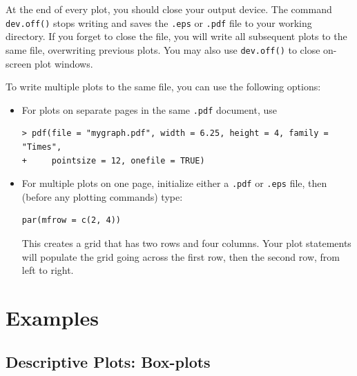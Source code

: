 \documentclass{article}
\begin{document}
At the end of every plot, you should close your output device.  The
command \texttt{dev.off()} stops writing and saves the \texttt{.eps}
or {\tt .pdf} file to your working directory.  If you forget to close
the file, you will write all subsequent plots to the same file,
overwriting previous plots.  You may also use \texttt{dev.off()} to close
on-screen plot windows.

To write multiple plots to the same file, you can use the following
options:  
\begin{itemize}
\item For plots on separate pages in the same {\tt .pdf} document, use
\begin{verbatim}
> pdf(file = "mygraph.pdf", width = 6.25, height = 4, family = "Times", 
+     pointsize = 12, onefile = TRUE)
\end{verbatim}
\item For multiple plots on one page, initialize either a {\tt .pdf}
or {\tt .eps} file, then (before any plotting commands) type:  
\begin{verbatim}
par(mfrow = c(2, 4))
\end{verbatim}
This creates a grid that has two rows and four columns.  Your plot
statements will populate the grid going across the first row, then the
second row, from left to right.  
\end{itemize}

\newpage

\section{Examples}

\subsection{Descriptive Plots: Box-plots}
\end{document}
